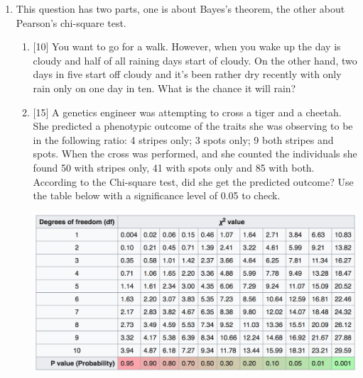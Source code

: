 \documentclass{article}
\begin{document}
\begin{enumerate}
\item This question has two parts, one is about Bayes's theorem, the other about Pearson's chi-square test.

  \begin{enumerate}
  \item{} [10] You want to go for a walk. However, when you wake up the day is cloudy and half of all raining days start of cloudy. On the other hand, two days in five start off cloudy and it's been rather dry recently with only rain only on one day in ten. What is the chance it will rain?
\item{} [15]  A genetics engineer was attempting to cross a tiger and a cheetah. She predicted a phenotypic outcome of the traits she was observing to be in the following ratio: 4 stripes only; 3 spots only; 9 both stripes and spots. When the cross was performed, and she counted the individuals she found 50 with stripes only, 41 with spots only and 85 with both. According to the Chi-square test, did she get the predicted outcome? Use the table below with a significance level of 0.05 to check. 

	\begin{center}
		\includegraphics[width=5.5in]{chi-square.png}
	\end{center}
\end{enumerate}
  

\end{enumerate}
\end{document}
